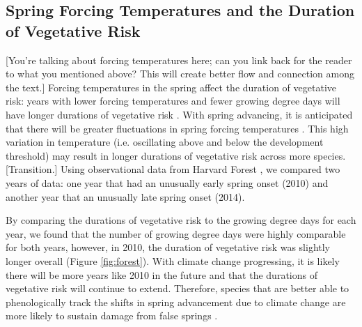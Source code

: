 \documentclass{article}\usepackage[]{graphicx}\usepackage[]{color}
\begin{document}
\subsection{Spring Forcing Temperatures and the Duration of Vegetative Risk}
[You're talking about forcing temperatures here; can you link back for the reader to what you mentioned above? This will create better flow and connection among the text.] Forcing temperatures in the spring affect the duration of vegetative risk: years with lower forcing temperatures and fewer growing degree days will have longer durations of vegetative risk \citep{Donnelly2017}. With spring advancing, it is anticipated that there will be greater fluctuations in spring forcing temperatures \citep{Martin2010}. This high variation in temperature (i.e. oscillating above and below the development threshold) may result in longer durations of vegetative risk across more species. [Transition.] Using observational data from Harvard Forest \citep{Okeefe2014}, we compared two years of data: one year that had an unusually early spring onset (2010) and another year that an unusually late spring onset (2014).

By comparing the durations of vegetative risk to the growing degree days for each year, we found that the number of growing degree days were highly comparable for both years, however, in 2010, the duration of vegetative risk was slightly longer overall (Figure \ref{fig:forest}). With climate change progressing, it is likely there will be more years like 2010 in the future and that the durations of vegetative risk will continue to extend. Therefore, species that are better able to phenologically track the shifts in spring advancement due to climate change are more likely to sustain damage from false springs \citep{Scheifinger2003}.
\end{document}

